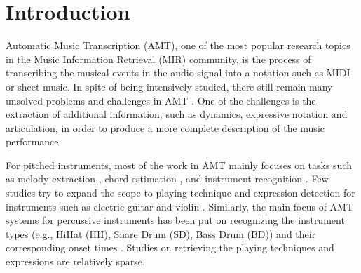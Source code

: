 \documentclass{article}
\begin{document}
%

\section{Introduction}\label{sec:introduction}

Automatic Music Transcription (AMT), one of the most popular research topics in the Music Information Retrieval (MIR) community, is the process of transcribing the musical events in the audio signal into a notation such as MIDI or sheet music. In spite of being intensively studied, there still remain many unsolved problems and challenges in AMT \cite{Benetos2013}. One of the challenges is the extraction of additional information, such as dynamics, expressive notation and articulation, in order to produce a more complete description of the music performance. 

For pitched instruments, most of the work in AMT mainly focuses on tasks such as melody extraction \cite{Bittner2015a}, chord estimation \cite{Humphrey2015}, and instrument recognition \cite{Hamel2009}. Few studies try to expand the scope to playing technique and expression detection for instruments such as electric guitar \cite{Su2014a, Chen2015} and violin \cite{Li2015a}. Similarly, the main focus of AMT systems for percussive instruments has been put on recognizing the instrument types (e.g., HiHat (HH), Snare Drum (SD), Bass Drum (BD)) and their corresponding onset times \cite{Benetos2014, Dittmar2014, Thompson2014, Roebel2015, Wu2015a}. Studies on retrieving the playing techniques and expressions are relatively sparse. 
\end{document}
